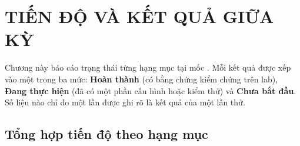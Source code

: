 \section{TIẾN ĐỘ VÀ KẾT QUẢ GIỮA KỲ}\label{sec:tien_do}

Chương này báo cáo trạng thái từng hạng mục tại mốc \mocbaocao. Mỗi kết quả được xếp vào một trong ba mức: \textbf{Hoàn thành} (có bằng chứng kiểm chứng trên lab), \textbf{Đang thực hiện} (đã có một phần cấu hình hoặc kiểm thử) và \textbf{Chưa bắt đầu}. Số liệu nào chỉ đo một lần được ghi rõ là kết quả của một lần thử.

\subsection{Tổng hợp tiến độ theo hạng mục}

\begingroup
\scriptsize
\setlength{\tabcolsep}{3pt}
